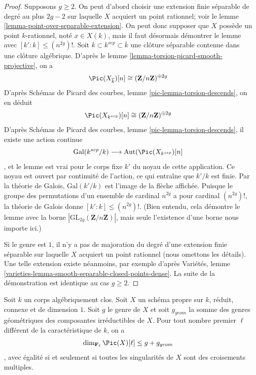 \begin{proof}
Supposons $g \geq 2$. On peut d'abord choisir une extension finie séparable de degré au plus $2g - 2$ sur laquelle $X$ acquiert un point rationnel; voir le lemme \ref{lemma-point-over-separable-extension}. On peut donc supposer que $X$ possède un point $k$-rationnel, noté $x \in X(k)$, mais il faut désormais démontrer le lemme avec $[k' : k] \leq (n^{2g})!$. Soit $k \subset k^{sep} \subset \overline{k}$ une clôture séparable contenue dans une clôture algébrique. D'après le lemme \ref{lemma-torsion-picard-smooth-projective}, on a $$
\Pic(X_{\overline{k}})[n] \cong (\mathbf{Z}/n\mathbf{Z})^{\oplus 2g}
$$ D'après Schémas de Picard des courbes, lemme \ref{pic-lemma-torsion-descends}, on en déduit $$
\Pic(X_{k^{sep}})[n] \cong (\mathbf{Z}/n\mathbf{Z})^{\oplus 2g}
$$ D'après Schémas de Picard des courbes, lemme \ref{pic-lemma-torsion-descends}, il existe une action continue $$
\text{Gal}(k^{sep}/k)
\longrightarrow
\text{Aut}(\Pic(X_{k^{sep}})[n]
$$, et le lemme est vrai pour le corps fixe $k'$ du noyau de cette application. Ce noyau est ouvert par continuité de l'action, ce qui entraîne que $k'/k$ est finie. Par la théorie de Galois, $\text{Gal}(k'/k)$ est l'image de la flèche affichée. Puisque le groupe des permutations d'un ensemble de cardinal $n^{2g}$ a pour cardinal $(n^{2g})!$, la théorie de Galois donne $[k' : k] \leq (n^{2g})!$. (Bien entendu, cela démontre le lemme avec la borne $|\text{GL}_{2g}(\mathbf{Z}/n\mathbf{Z})|$, mais seule l'existence d'une borne nous importe ici.)

\medskip\noindent
Si le genre est $1$, il n'y a pas de majoration du degré d'une extension finie séparable sur laquelle $X$ acquiert un point rationnel (nous omettons les détails). Une telle extension existe néanmoins, par exemple d'après Variétés, lemme \ref{varieties-lemma-smooth-separable-closed-points-dense}. La suite de la démonstration est identique au cas $g \geq 2$.
\end{proof}

\begin{proposition}
\label{proposition-torsion-picard-reduced-proper}
Soit $k$ un corps algébriquement clos. Soit $X$ un schéma propre sur $k$, réduit, connexe et de dimension $1$. Soit $g$ le genre de $X$ et soit $g_{geom}$ la somme des genres géométriques des composantes irréductibles de $X$. Pour tout nombre premier $\ell$ différent de la caractéristique de $k$, on a $$
\dim_{\mathbf{F}_\ell} \Pic(X)[\ell]
\leq g + g_{geom}
$$, avec égalité si et seulement si toutes les singularités de $X$ sont des croisements multiples.
\end{proposition}

